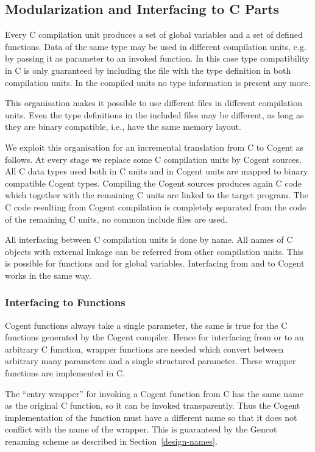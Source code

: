 \subsection{Modularization and Interfacing to C Parts}
\label{design-modular}

Every C compilation unit produces
a set of global variables and a set of defined functions. Data of the same type may be used in
different compilation units, e.g. by passing it as parameter to an invoked function. In this case type compatibility in C is
only guaranteed by including the  file with the type definition in both compilation units. In the compiled
units no type information is present any more. 

This organisation makes it possible to use different  files in different compilation units. Even the type definitions
in the included files may be different, as long as they are binary compatible, i.e., have the same memory layout.

We exploit this organisation for an incremental translation from C to Cogent as follows. At every stage we replace some 
C compilation units by Cogent sources. All C data types used both in C units and in Cogent units are mapped to binary compatible
Cogent types. Compiling the Cogent sources produces again C code which together with the remaining C units are linked to
the target program. The C code resulting from Cogent compilation is completely separated from the code of the remaining C units,
no common include files are used.

All interfacing between C compilation units is done by name. All names of C objects with external linkage can be referred
from other compilation units. This is possible for functions and for global variables. Interfacing from and to Cogent works
in the same way. 

\subsubsection{Interfacing to Functions}

Cogent functions always take a single parameter, the same is true for the C functions generated by the Cogent compiler. Hence
for interfacing from or to an arbitrary C function, wrapper functions are needed which convert between arbitrary many parameters
and a single structured parameter. These wrapper functions are implemented in C. 

The ``entry wrapper'' for invoking a Cogent function 
from C has the same name as the original C function, so it can be invoked transparently. Thus the Cogent implementation of
the function must have a different name so that it does not conflict with the name of the wrapper. This is guaranteed by the 
Gencot renaming scheme as described in Section~\ref{design-names}.

